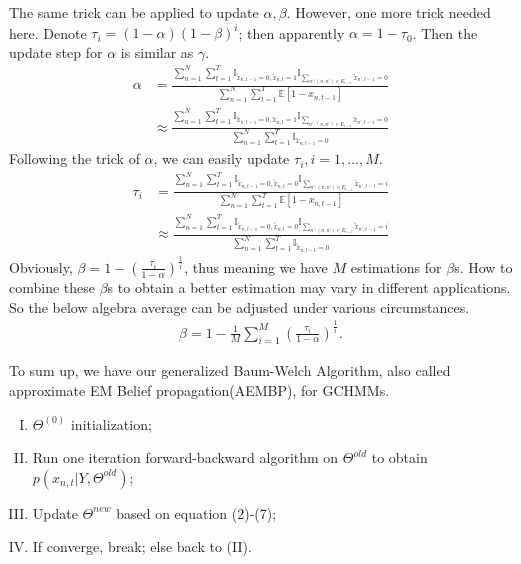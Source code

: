\documentclass{article} %
\begin{document}
The same trick can be applied to update $\alpha,\beta$. However, one more trick needed here. Denote $\tau_i=(1-\alpha)(1-\beta)^i$; then apparently $\alpha=1-\tau_0$. Then the update step for $\alpha$ is similar as $\gamma$.
%
\begin{align}
\alpha &= \frac{\sum_{n=1}^N\sum_{t=1}^{T}\mathbb{I}_{\tilde{x}_{n,t-1}=0,\tilde{x}_{n,t}=1}\mathbb{I}_{\sum_{n':(n,n')\in E_{t-1}}\tilde{x}_{n',t-1}=0}}{\sum_{n=1}^N\sum_{t=1}^{T}\mathbb{E}[1-x_{n,t-1}]} \nonumber \\
	   &\approx\frac{\sum_{n=1}^N\sum_{t=1}^{T}\mathbb{I}_{\tilde{x}_{n,t-1}=0,\tilde{x}_{n,t}=1}\mathbb{I}_{\sum_{n':(n,n')\in E_{t-1}}\tilde{x}_{n',t-1}=0}}{\sum_{n=1}^N\sum_{t=1}^{T}\mathbb{I}_{\tilde{x}_{n,t-1}=0}}
\end{align}
%
Following the trick of $\alpha$, we can easily update $\tau_i,i=1,...,M$. 
%
\begin{align*}
\tau_i &= \frac{\sum_{n=1}^N\sum_{t=1}^{T}\mathbb{I}_{\tilde{x}_{n,t-1}=0,\tilde{x}_{n,t}=0}\mathbb{I}_{\sum_{n':(n,n')\in E_{t-1}}\tilde{x}_{n',t-1}=i}}{\sum_{n=1}^N\sum_{t=1}^{T}\mathbb{E}[1-x_{n,t-1}]} \\
	   &\approx\frac{\sum_{n=1}^N\sum_{t=1}^{T}\mathbb{I}_{\tilde{x}_{n,t-1}=0,\tilde{x}_{n,t}=0}\mathbb{I}_{\sum_{n':(n,n')\in E_{t-1}}\tilde{x}_{n',t-1}=i}}{\sum_{n=1}^N\sum_{t=1}^{T}\mathbb{I}_{\tilde{x}_{n,t-1}=0}}
\end{align*}
%
Obviously, $\beta=1-\left(\frac{\tau_i}{1-\alpha}\right)^{\frac{1}{i}}$, thus meaning we have $M$ estimations for $\beta$s. How to combine these $\beta$s to obtain a better estimation may vary in different applications. So the below algebra average can be adjusted under various circumstances.
\begin{align}
\beta=1-\frac{1}{M}\sum_{i=1}^M\left(\frac{\tau_i}{1-\alpha}\right)^{\frac{1}{i}} .
\end{align}

To sum up, we have our generalized Baum-Welch Algorithm, also called approximate EM Belief propagation(AEMBP), for GCHMMs.
\begin{enumerate}[(I)]
\item $\Theta^{(0)}$ initialization;
\item Run one iteration forward-backward algorithm on $\Theta^{old}$ to obtain $p(x_{n,t}|Y,\Theta^{old})$;
\item Update $\Theta^{new}$ based on equation (2)-(7);
\item If converge, break; else back to (II).
\end{enumerate}
\end{document}
